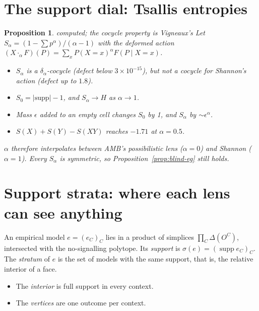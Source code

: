 \documentclass[11pt]{article}
\newtheorem{proposition}[theorem]{Proposition}
\theoremstyle{definition}
\theoremstyle{remark}
\newcommand{\st}[1]{\textsf{\small\color{gray}#1}}
\begin{document}
\section{The support dial: Tsallis entropies}\label{sec:tsallis}
\begin{proposition}\st{computed; the cocycle property is Vigneaux's}
Let $S_\alpha=(1-\sum p^\alpha)/(\alpha-1)$ with the deformed action $(X\cdot_\alpha F)(P)=\sum_xP(X{=}x)^\alpha F(P\mid X{=}x)$.
\begin{itemize}
  \item $S_\alpha$ is a $\delta_\alpha$-cocycle (defect below $3\times10^{-15}$), but not a cocycle for Shannon's action (defect up to $1.8$).
  \item $S_0=|\mathrm{supp}|-1$, and $S_\alpha\to H$ as $\alpha\to1$.
  \item Mass $\epsilon$ added to an empty cell changes $S_0$ by 1, and $S_\alpha$ by $\sim\epsilon^\alpha$.
  \item $S(X)+S(Y)-S(XY)$ reaches $-1.71$ at $\alpha=0.5$.
\end{itemize}
$\alpha$ therefore interpolates between AMB's possibilistic lens ($\alpha=0$) and Shannon ($\alpha=1$). Every $S_\alpha$ is symmetric, so Proposition~\ref{prop:blind-eg} still holds.
\end{proposition}

\section{Support strata: where each lens can see anything}\label{sec:strata}
An empirical model $e=(e_C)_C$ lies in a product of simplices $\prod_C\Delta(O^C)$, intersected with the no-signalling polytope. Its \emph{support} is $\sigma(e)=(\operatorname{supp}e_C)_C$. The \emph{stratum} of $e$ is the set of models with the same support, that is, the relative interior of a face.
\begin{itemize}
  \item The \emph{interior} is full support in every context.
  \item The \emph{vertices} are one outcome per context.
\end{itemize}
\end{document}
